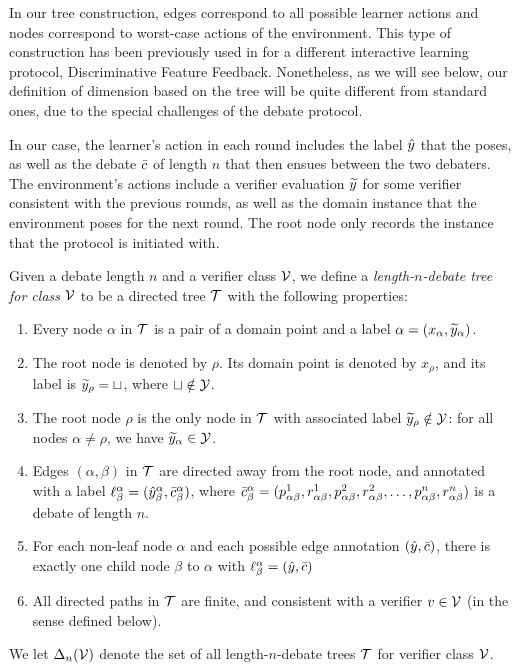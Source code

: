 \documentclass[anon]{alt2027} %
\begin{document}
In our tree construction, edges correspond to all possible learner actions 
and nodes correspond to worst-case actions of the environment. 
This type of construction has been previously used in \cite{oz2026discriminative} for a different interactive learning protocol, Discriminative Feature Feedback. Nonetheless, as we will see below, our definition of dimension based on the tree will be quite different from standard ones, due to the special challenges of the debate protocol.

In our case, the learner's action in each round includes the label $\hy$ that the \dt poses, as well as the debate $\sc$ of length $n$ that then ensues between the two debaters.
The environment's actions include a verifier evaluation $\vy$ for some verifier consistent with the previous rounds, as well as the  domain instance that the environment poses for the next round.
The root node only records the instance that the protocol is initiated with.



\begin{definition}
Given a debate length $n$ and a verifier class $\V$, we define a \emph{length-$n$-debate tree for class $\V$} to be a directed tree $\T$ with the following properties:
\begin{enumerate}
    \item Every node $\alpha$ in $\T$ is a pair of a domain point and a label $\alpha=(x_\alpha, \vy_\alpha)$.
    \item The root node is denoted by $\rho$. Its domain point is denoted by $x_\rho$, and its label is $\vy_\rho = \sqcup$, where $\sqcup\notin\Y$. \item The root node $\rho$ is the only node in $\T$ with associated label $\vy_\rho \notin\Y$: for all nodes $\alpha\neq \rho$, we have $\vy_\alpha\in \Y$.
    \item Edges $(\alpha, \beta)$ in $\T$ are directed away from the root node, and annotated with a label $\ell^\alpha_\beta = (\hy^\alpha_\beta, \sc^\alpha_\beta)$, where $\sc^\alpha_\beta = (\ct^1_{\alpha\beta}, \cf^1_{\alpha\beta}, \ct^2_{\alpha\beta}, \cf^2_{\alpha\beta}, \ldots,  \ct^n_{\alpha\beta}, \cf^n_{\alpha\beta})$ is a debate of length $n$.
    \item For each non-leaf node $\alpha$ and each possible edge annotation $(\hy, \sc)$, there is exactly one child node $\beta$ to $\alpha$ with $\ell^\alpha_\beta = (\hy, \sc)$
    \item All directed paths in $\T$ are finite, and consistent with a verifier $v\in\V$ (in the sense defined below).
\end{enumerate}
We let $\Delta_n(\V)$ denote the set of all length-$n$-debate trees $\T$ for verifier class $\V$.
\end{definition}
\end{document}
